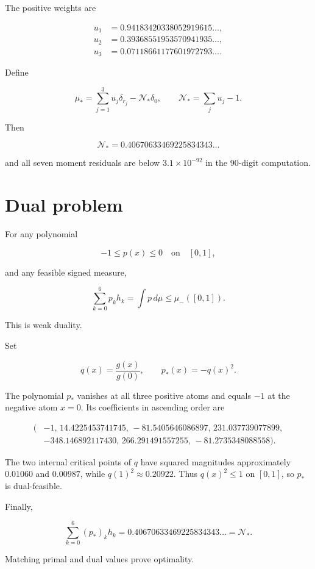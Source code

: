 \documentclass[11pt,a4paper,openany]{report}
\begin{document}
The positive weights are

\[
\begin{aligned}
u_1&=0.94183420338052919615\ldots,\\
u_2&=0.39368551953570941935\ldots,\\
u_3&=0.07118661177601972793\ldots.
\end{aligned}
\]

Define

\[
\mu_*=
\sum_{j=1}^{3}u_j\delta_{r_j}
-\mathcal N_*\delta_0,
\qquad
\mathcal N_*=\sum_j u_j-1.
\]

Then

\[
\mathcal N_*
=0.40670633469225834343\ldots
\]

and all seven moment residuals are below \(3.1\times10^{-92}\) in the 90-digit computation.

\section{Dual problem}

For any polynomial

\[
-1\le p(x)\le0
\quad\text{on}\quad[0,1],
\]

and any feasible signed measure,

\[
\sum_{k=0}^{6}p_kh_k
=\int p\,d\mu
\le\mu_-([0,1]).
\]

This is weak duality.

Set

\[
q(x)=\frac{g(x)}{g(0)},
\qquad
p_*(x)=-q(x)^2.
\]

The polynomial \(p_*\) vanishes at all three positive atoms and equals \(-1\) at the negative atom \(x=0\).  Its coefficients in ascending order are

\[
\begin{aligned}
(&-1,\,
14.4225453741745,\,
-81.5405646086897,\,
231.037739077899,\\
&-348.146892117430,\,
266.291491557255,\,
-81.2735348088558).
\end{aligned}
\]

The two internal critical points of \(q\) have squared magnitudes approximately \(0.01060\) and \(0.00987\), while \(q(1)^2\approx0.20922\).  Thus \(q(x)^2\le1\) on \([0,1]\), so \(p_*\) is dual-feasible.

Finally,

\[
\sum_{k=0}^{6}(p_*)_kh_k
=0.40670633469225834343\ldots
=\mathcal N_*.
\]

Matching primal and dual values prove optimality.
\end{document}
